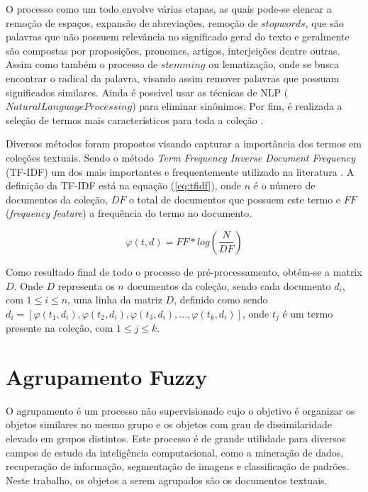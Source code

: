 O processo como um todo envolve várias etapas, as quais pode-se elencar a remoção de espaços,
expansão de abreviações, remoção de $stopwords$, que são palavras que não possuem relevância no
significado geral do texto e geralmente são compostas por proposições, pronomes, artigos,
interjeições dentre outras\cite{Nogueira2013}. Assim como também o processo de $stemming$ ou
lematização, onde se busca encontrar o radical da palavra, visando assim remover palavras que
possuam significados similares. Ainda é possível usar as técnicas de NLP ($Natural Language
Processing$) para eliminar sinônimos. Por fim, é realizada a seleção de termos mais característicos para toda a coleção \cite{Haddi2013}. 

Diversos métodos foram propostos visando capturar a importância dos termos em coleções
textuais. Sendo o método { \it Term Frequency Inverse Document Frequency\/ }(TF-IDF) um dos mais
importantes e frequentemente utilizado na literatura \cite{Haddi2013}. A definição da TF-IDF está na
equação (\ref{eq:tfidf}), onde $n$ é o número de documentos da coleção, $DF$ o total de documentos
que possuem este termo e $FF$ ({\it frequency feature}) a frequência do termo no documento.

\begin{equation} \varphi(t,d) = FF * log(\frac{N}{DF}) \label{eq:tfidf} \end{equation}

Como resultado final de todo o processo de pré-processamento, obtém-se a matrix $D$. Onde $D$
representa os $n$ documentos da coleção, sendo cada documento $d_{i}$, com $1 \leq i \leq n$, uma
linha da matriz $D$, definido como sendo $ d_{i} =
[\varphi(t_{1},d_{i}),\varphi(t_{2},d_{i}),\varphi(t_{3},d_{i}),...,\varphi(t_{k},d_{i})] $, onde
$t_{j}$ é um termo presente na coleção, com $1 \leq j \leq k$.

\section{Agrupamento Fuzzy} 

O agrupamento é um processo não supervisionado cujo o objetivo é organizar os objetos similares no mesmo grupo e os objetos com grau de
dissimilaridade elevado em grupos distintos\cite{Nogueira2013}. Este processo é de
grande utilidade para diversos campos de estudo da inteligência computacional, como a mineração de
dados, recuperação de informação, segmentação de imagens e classificação de padrões. Neste trabalho, os objetos a serem agrupados são os documentos textuais.

